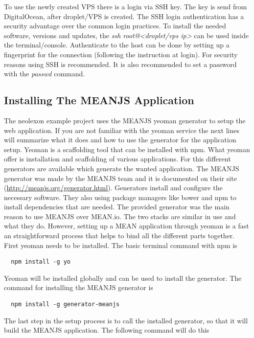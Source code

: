 To use the newly created VPS there is a login via SSH key. The key is send from DigitalOcean, after droplet/VPS is created. The SSH login authentication has a security
advantage over the common login practices. To install the needed software, versions and updates, the \textit{ssh root@<droplet/vps ip>} can be used inside the
terminal/console. Authenticate to the host can be done by setting up a fingerprint for the connection (following the instruction at login). For security reasons
using SSH is recommended. It is also recommended to set a password with the \textit{passwd} command.

\subsection{Installing The MEANJS Application}
The neolexon example project uses the MEANJS yeoman generator to setup the web application. If you are not familiar with the yeoman service the next lines
will summarize what it does and how to use the generator for the application setup. Yeoman is a scaffolding tool that can be installed with npm. What yeoman offer is
installation and scaffolding of various applications. For this different generators are available which generate the wanted application. The MEANJS generator
was made by the MEANJS team and it is documented on their site (\url{http://meanjs.org/generator.html}). Generators install and configure the necessary software.
They also using package managers like bower and npm to install dependencies that are needed. The provided generator was the main reason to use MEANJS over MEAN.io.
The two stacks are similar in use and what they do. However, setting up a MEAN application through yeoman is a fast an straightforward process that helps to bind all
the different parts together. First yeoman needs to be installed. The basic terminal command with npm is

\begin{lstlisting}
  npm install -g yo
\end{lstlisting}

Yeoman will be installed globally and can be used to install the generator. The command for installing the MEANJS generator is

\begin{lstlisting}
  npm install -g generator-meanjs
\end{lstlisting}

The last step in the setup process is to call the installed generator, so that it will build the MEANJS application. The following command will do this

